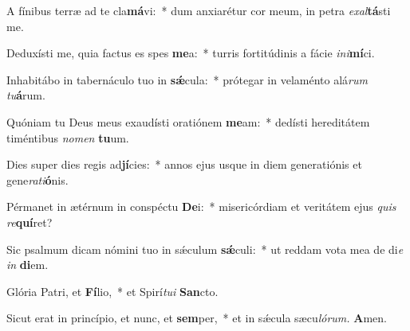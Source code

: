 \item A fínibus terræ ad te cla\textbf{má}vi:~* dum anxiarétur cor meum, in petra \textit{exal}\textbf{tá}sti me.
\item Deduxísti me, quia factus es spes \textbf{me}a:~* turris fortitúdinis a fácie \textit{ini}\textbf{mí}ci.
\item Inhabitábo in tabernáculo tuo in \textbf{sǽ}cula:~* prótegar in velaménto alá\textit{rum} \textit{tu}\textbf{á}rum.
\item Quóniam tu Deus meus exaudísti oratiónem \textbf{me}am:~* dedísti hereditátem timéntibus \textit{nomen} \textbf{tu}um.
\item Dies super dies regis ad\textbf{jí}cies:~* annos ejus usque in diem generatiónis et gene\hspace{0.03em}\textit{rati}\textbf{ó}nis.
\item Pérmanet in ætérnum in conspéctu \textbf{De}i:~* misericórdiam et veritátem ejus \textit{quis} \textit{re}\textbf{quí}ret?
\item Sic psalmum dicam nómini tuo in sǽculum \textbf{sǽ}culi:~* ut reddam vota mea de di\hspace{0.03em}\textit{e} \textit{in} \textbf{di}em.
\item Glória Patri, et \textbf{Fí}lio,~* et Spirí\hspace{0.03em}\textit{tui} \textbf{San}cto.
\item Sicut erat in princípio, et nunc, et \textbf{sem}per,~* et in sǽcula sæcu\hspace{0.03em}\textit{lórum.} \textbf{A}men.